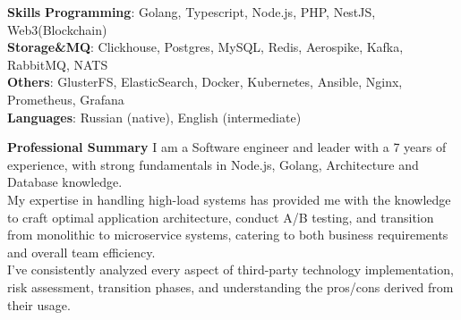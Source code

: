 \documentclass{resume} %
\begin{document}
\begin{rSection}{\textbf{Skills}}
       \textbf{Programming}: Golang, Typescript, Node.js, PHP, NestJS, Web3(Blockchain)
       \\ \textbf{Storage\&MQ}: Clickhouse, Postgres, MySQL, Redis, Aerospike, Kafka, RabbitMQ, NATS
       \\ \textbf{Others}: GlusterFS, ElasticSearch, Docker, Kubernetes, Ansible, Nginx, Prometheus, Grafana
       \\ \textbf{Languages}: Russian (native), English (intermediate)
\end{rSection}

\begin{rSection}{\textbf{Professional Summary}}
{ I am a Software engineer and leader with a 7 years of experience, with strong fundamentals in Node.js, Golang, Architecture and Database
knowledge.
\\ My expertise in handling high-load systems has provided me with the knowledge to craft optimal application architecture, conduct A/B testing, and transition from monolithic to microservice systems, catering to both business requirements and overall team efficiency.
\\ I've consistently analyzed every aspect of third-party technology implementation, risk assessment, transition phases, and understanding the pros/cons derived from their usage.
}

\end{rSection}
\end{document}
